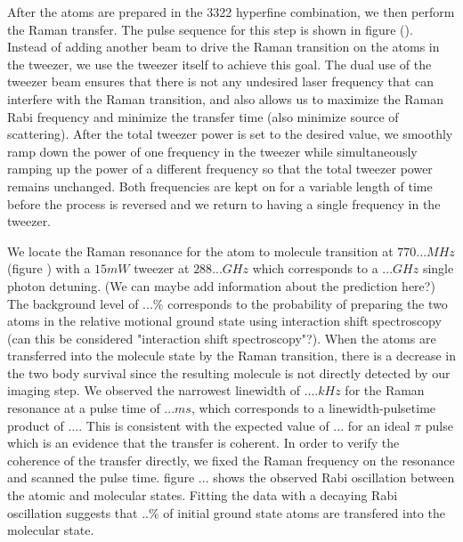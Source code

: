 \documentclass[aps,prl,twocolumn,groupedaddress]{revtex4-1}
\newcommand{\todo}[1]{}
\begin{document}
After the atoms are prepared in the 3322 hyperfine combination, we then perform the Raman transfer. The pulse sequence for this step is shown in figure (). Instead of adding another beam to drive the Raman transition on the atoms in the tweezer, we use the tweezer itself to achieve this goal. The dual use of the tweezer beam ensures that there is not any undesired laser frequency that can interfere with the Raman transition, and also allows us to maximize the Raman Rabi frequency and minimize the transfer time (also minimize source of scattering). After the total tweezer power is set to the desired value, we smoothly ramp down the power of one frequency in the tweezer while simultaneously ramping up the power of a different frequency so that the total tweezer power remains unchanged. Both frequencies are kept on for a variable length of time before the process is reversed and we return to having a single frequency in the tweezer.
\todo{clarify coprop of Raman beam?}


We locate the Raman resonance for the atom to molecule transition at $770... MHz$ (figure \todo{}) with a $15 mW$ tweezer at $288... GHz$ which corresponds to a $... GHz$ single photon detuning. (We can maybe add information about the prediction here?)
The background level of $...\%$ corresponds to the probability of preparing the two atoms in the relative motional ground state using interaction shift spectroscopy (can this be considered "interaction shift spectroscopy"?). When the atoms are transferred into the molecule state by the Raman transition, there is a decrease in the two body survival since the resulting molecule is not directly detected by our imaging step.
We observed the narrowest linewidth of $.... kHz$ for the Raman resonance at a pulse time of $... ms$, which corresponds to a linewidth-pulsetime product of $...$. This is consistent with the expected value of $...$ for an ideal $\pi$ pulse which is an evidence that the transfer is coherent. In order to verify the coherence of the transfer directly, we fixed the Raman frequency on the resonance and scanned the pulse time. figure ... shows the observed Rabi oscillation between the atomic and molecular states. Fitting the data with a decaying Rabi oscillation suggests that $..\%$ of initial ground state atoms are transfered into the molecular state.
\end{document}
